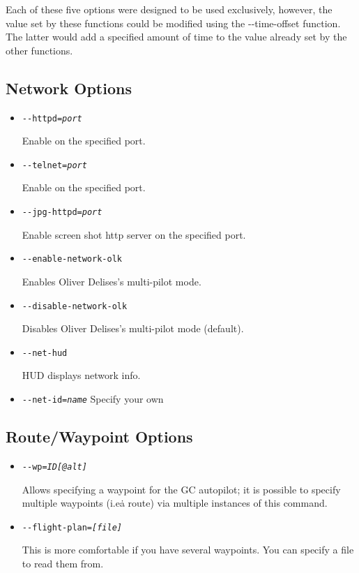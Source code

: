 Each of these five options were designed to be used exclusively, however, the 
value set by these functions could be modified using the {-$ $-time-offset}
function. The latter would add a specified amount of time to the value 
already set by the other functions. 
\subsection{Network Options}
\begin{itemize}
\item{\texttt{-$ $-httpd={\it port}}}

  Enable  on the specified port.

\item{\texttt{-$ $-telnet={\it port}}}

  Enable  on the specified port.

\item{\texttt{-$ $-jpg-httpd={\it port}}}

  Enable screen shot http server on the specified port.

\item{\texttt{-$ $-enable-network-olk}}

  Enables Oliver Delises's multi-pilot mode.

\item{\texttt{-$ $-disable-network-olk}}

  Disables Oliver Delises's multi-pilot mode (default).

\item{\texttt{-$ $-net-hud}}

  HUD displays network info.

\item{\texttt{-$ $-net-id={\it name}}}
  Specify your own 
 \end{itemize}
\subsection{Route/Waypoint Options}
\begin{itemize}
\item{\texttt{-$ $-wp={\it ID[@alt]}}}

  Allows specifying a waypoint for the GC autopilot; it is possible to
  specify multiple waypoints (i.e\. a route) via multiple instances of
  this command.

\item{\texttt{-$ $-flight-plan={\it [file]}}}

  This is more comfortable if you have several waypoints. You can
  specify a file to read them from.
\end{itemize}

